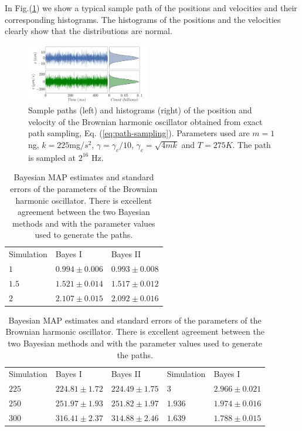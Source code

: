 \documentclass[english,aps, twocolumn, pre,superscriptaddress, notitlepage]{revtex4-1}
\providecommand{\tabularnewline}{\\}
\begin{document}
In Fig.(\ref{fig:PositionsVelocity}) we show a typical sample path
of the positions and velocities and their corresponding histograms.
The histograms of the positions and the velocities clearly show that
the distributions are normal. 
\begin{figure}
\includegraphics[width=0.48\textwidth]{Fig1}\caption{Sample paths (left) and histograms (right) of the position and velocity
of the Brownian harmonic oscillator obtained from exact path sampling,
Eq. (\ref{eq:path-sampling}). Parameters used are $m=1$ng, $k=225$mg/$s^{2}$,
$\gamma=\gamma_{c}/10$, $\gamma_{c}=\sqrt{4mk}$ and $T=275K$. The
path is sampled at $2^{16}$ Hz. \label{fig:PositionsVelocity}}
\end{figure}
\begin{table}
\begin{tabular}{|>{\centering}p{2cm}|>{\centering}p{2cm}|>{\centering}p{2cm}|}
\hline 
\multicolumn{3}{|c|}{$m\;\big(ng\big)$}\tabularnewline
\hline 
Simulation & Bayes I & Bayes II\tabularnewline
\hline 
\hline 
$1$ & $0.994\pm0.006$ & $0.993\pm0.008$\tabularnewline
\hline 
$1.5$ & $1.521\pm0.014$ & $1.517\pm0.012$\tabularnewline
\hline 
$2$ & $2.107\pm0.015$ & $2.092\pm0.016$\tabularnewline
\hline 
\end{tabular}%
\begin{tabular}{>{\centering}p{2cm}|>{\centering}p{2cm}|>{\centering}p{2cm}|>{\centering}p{2cm}|>{\centering}p{2cm}|}
\hline 
\multicolumn{3}{c|}{$k\;(mg/s^{2})$} & \multicolumn{2}{c|}{$\gamma\;(\mu g/s^{2})$}\tabularnewline
\hline 
Simulation & Bayes I & Bayes II & Simulation & Bayes I\tabularnewline
\hline 
\hline 
$225$ & $224.81\pm1.72$ & $224.49\pm1.75$ & $3$ & $2.966\pm0.021$\tabularnewline
\hline 
$250$ & $251.97\pm1.93$ & $251.82\pm1.97$ & $1.936$ & $1.974\pm0.016$\tabularnewline
\hline 
$300$ & $316.41\pm2.37$ & $314.88\pm2.46$ & $1.639$ & $1.788\pm0.015$\tabularnewline
\hline 
\end{tabular}

\caption{Bayesian MAP estimates and standard errors of the parameters of the
Brownian harmonic oscillator. There is excellent agreement between
the two Bayesian methods and with the parameter values used to generate
the paths. \label{tab:springconstant}}
\end{table}
\end{document}
